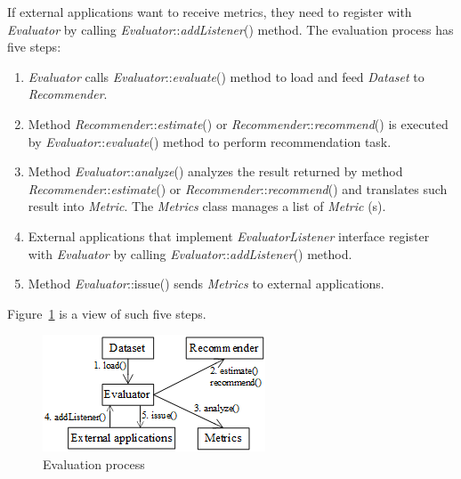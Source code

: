 \documentclass[a4paper,twoside]{article}
\begin{document}
If external applications want to receive metrics, they need to register with \textit{Evaluator} by calling \textit{Evaluator}::\textit{addListener}() method. The evaluation process has five steps:
\begin{enumerate}
\item \textit{Evaluator} calls \textit{Evaluator}::\textit{evaluate}() method to load and feed \textit{Dataset} to \textit{Recommender}.
\item Method \textit{Recommender}::\textit{estimate}() or \textit{Recommender}::\textit{recommend}() is executed by \textit{Evaluator}::\textit{evaluate}() method to perform recommendation task.
\item Method \textit{Evaluator}::\textit{analyze}() analyzes the result returned by method \textit{Recommender}::\textit{estimate}() or \textit{Recommender}::\textit{recommend}() and translates such result into \textit{Metric}. The \textit{Metrics} class manages a list of \textit{Metric} (s).
\item External applications that implement \textit{EvaluatorListener} interface register with \textit{Evaluator} by calling \textit{Evaluator}::\textit{addListener}() method.
\item Method \textit{Evaluator}::issue() sends \textit{Metrics} to external applications.
\end{enumerate}
Figure~\ref{figure:evaluation-process} is a view of such five steps.
\begin{figure}
\centering
\includegraphics{EvaluationProcess.png}
\caption{Evaluation process}
\label{figure:evaluation-process}
\end{figure}
\end{document}

